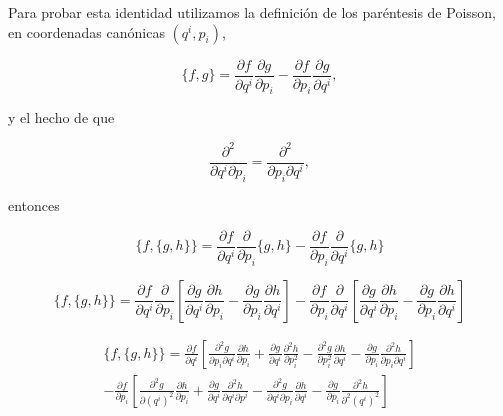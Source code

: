 \documentclass[a4paper,10pt]{article}
\numberwithin{equation}{section}
\begin{document}
Para probar esta identidad utilizamos la definición de los paréntesis de Poisson, 
en coordenadas canónicas $(q^i,p_i)$, 

\begin{equation}
 \{f,g\} = \frac{\partial f}{\partial q^i}\frac{\partial g}{\partial p_i} - 
 \frac{\partial f}{\partial p_i}\frac{\partial g}{\partial q^i},
\end{equation}

y el hecho de que 

\begin{equation}
 \frac{\partial^2}{\partial q^i \partial p_i} = \frac{\partial^2}{\partial p_i \partial q^i},
\end{equation}


entonces 

\begin{equation}
  \{f,\{g,h\}\} = \frac{\partial f}{\partial q^i}\frac{\partial }{\partial p_i}\{g,h\} - 
 \frac{\partial f}{\partial p_i}\frac{\partial }{\partial q^i}\{g,h\} 
\end{equation}

\begin{equation}
  \{f,\{g,h\}\} = \frac{\partial f}{\partial q^i}\frac{\partial }{\partial p_i}\left[
   \frac{\partial g}{\partial q^i}\frac{\partial h}{\partial p_i} - 
 \frac{\partial g}{\partial p_i}\frac{\partial h}{\partial q^i}\right] 
 - \frac{\partial f}{\partial p_i}\frac{\partial}{\partial q^i}\left[
   \frac{\partial g}{\partial q^i}\frac{\partial h}{\partial p_i} - 
 \frac{\partial g}{\partial p_i}\frac{\partial h}{\partial q^i}\right] 
\end{equation}

\begin{align}
  \{f,\{g,h\}\} = \frac{\partial f}{\partial q^i}\left[
  \frac{\partial^2 g}{\partial p_i\partial q^i}\frac{\partial h}{\partial p_i} 
  + \frac{\partial g}{\partial q^i}\frac{\partial^2 h}{\partial p_i^2} 
  - \frac{\partial^2 g}{\partial p_i^2}\frac{\partial h}{\partial q^i} 
  - \frac{\partial g}{\partial p_i}\frac{\partial^2 h}{\partial p_i \partial q^i}\right] \\
  - \frac{\partial f}{\partial p_i}\left[\frac{\partial^2 g}{\partial (q^i)^2}
  \frac{\partial h}{\partial p_i} + \frac{\partial g}{\partial q^i}
  \frac{\partial^2 h}{\partial q^i\partial p^i} - \frac{\partial^2 g}{\partial q^i\partial p_i}
  \frac{\partial h}{\partial q^i} - \frac{\partial g}{\partial p_i}
  \frac{\partial^2 h}{\partial^2(q^i)^2}\right]
\end{align}
\end{document}
